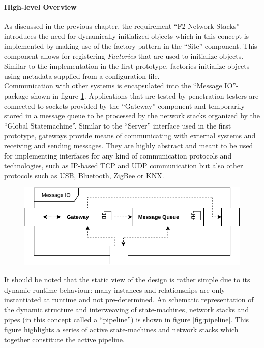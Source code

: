 \paragraph{High-level Overview}
As discussed in the previous chapter, the requirement \enquote{F2 Network Stacks} introduces the need for dynamically initialized objects which in this concept is implemented by making use of the factory pattern in the \enquote{Site} component. This component allows for registering \emph{Factories} that are used to initialize objects. Similar to the implementation in the first prototype, factories initialize objects using metadata supplied from a configuration file.\\
Communication with other systems is encapsulated into the \enquote{Message IO}-package shown in figure \ref{fig:component-view-2}. Applications that are tested by penetration testers are connected to sockets provided by the \enquote{Gateway} component and temporarily stored in a message queue to be processed by the network stacks organized by the \enquote{Global Statemachine}. Similar to the \enquote{Server} interface used in the first prototype, gateways provide means of communicating with external systems and receiving and sending messages. They are highly abstract and meant to be used for implementing interfaces for any kind of communication protocols and technologies, such as \ac{IP}-based \ac{TCP} and \ac{UDP} communication but also other protocols such as USB, Bluetooth, ZigBee or KNX.
\begin{figure}[h]
    \centering
    \includegraphics[width=12cm]{img/ch05/component-view-2-messageio.pdf}
    \label{fig:component-view-2}
\end{figure}
It should be noted that the static view of the design is rather simple due to its dynamic runtime behaviour: many instances and relationships are only instantiated at runtime and not pre-determined. An schematic representation of the dynamic structure and interweaving of state-machines, network stacks and pipes (in this concept called a \enquote{pipeline}) is shown in figure \ref{fig:pipeline}. This figure highlights a series of active state-machines and network stacks which together constitute the active pipeline. \\
